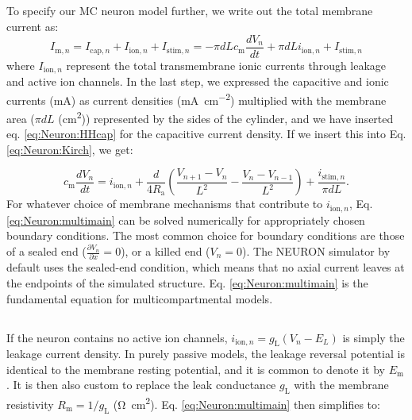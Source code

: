 \subsection{}
\label{sec:Neuron:Active_multicomp}
To specify our MC neuron model further, we write out the total membrane current as:
\begin{equation}
I_{\mathrm{m},n} = I_{\mathrm{cap},n} + I_{\mathrm{ion},n} + I_{\mathrm{stim},n} = -\pi d L c_\text{m} \frac{dV_n}{dt} + \pi d L i_{\mathrm{ion},n} + I_{\mathrm{stim},n}
\label{eq:Neuron:Imemb}
\end{equation}
where $I_{\mathrm{ion},n}$ represent the total transmembrane ionic currents through leakage and active ion channels. In the last step, we expressed the capacitive and ionic currents (\si{\milli\ampere}) as current densities (\si{\milli\ampere\per\square\centi\metre}) multiplied with the membrane area ($\pi d L$ (\si{\square\centi\metre})) represented by the sides of the cylinder, and we have inserted eq. \ref{eq:Neuron:HHcap} for the capacitive current density. If we insert this into Eq. \ref{eq:Neuron:Kirch}, we get:

\begin{equation}
c_\text{m} \frac{dV_n}{dt} = i_{\mathrm{ion},n} + \frac{d}{4R_\text{a}}\left(\frac{V_{n+1}-V_n}{L^2} - \frac{V_n-V_{n-1}}{L^2} \right) + \frac{i_{\mathrm{stim},n}}{\pi d L}.
\label{eq:Neuron:multimain}
\end{equation}
For whatever choice of membrane mechanisms that contribute to $i_{\mathrm{ion},n}$, Eq. \ref{eq:Neuron:multimain} can be solved numerically for appropriately chosen boundary conditions. The most common choice for boundary conditions are those of a sealed end ($\frac{\partial V_n}{\partial x} = 0$), or a killed end ($V_n=0$). The NEURON simulator by default uses the sealed-end condition, which means that no axial current leaves at the endpoints of the simulated structure. Eq. \ref{eq:Neuron:multimain} is the fundamental equation for multicompartmental models.



\subsection{}
\label{sec:Neuron:Passive_multicomp}
If the neuron contains no active ion channels, $i_{\mathrm{ion},n} = g_\text{L}(V_n - E_L)$ is simply the leakage current density. In purely passive models, the leakage reversal potential is identical to the membrane resting potential, and it is common to denote it by $E_\text{m}$. It is then also custom to replace the leak conductance $g_\text{L}$ with the membrane resistivity $R_\text{m} = 1/g_\text{L}$ (\si{\ohm\square\centi\metre}). Eq. \ref{eq:Neuron:multimain} then simplifies to:

